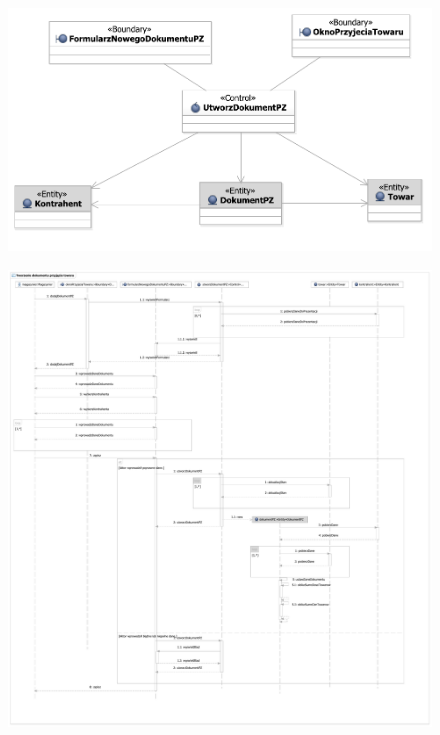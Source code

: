 \begin{figure}[H]
  \centering
  \includegraphics[angle=\ecbangle, scale=\ecbscale]{../img/usecase/pu24ecb.pdf}
  \caption{}
\end{figure}
\newpage
\begin{figure}[H]
  \centering
  \includegraphics[angle=\seqangle, scale=0.35]{../img/usecase/pu24seq.pdf}
  \caption{}
\end{figure}
\newpage

